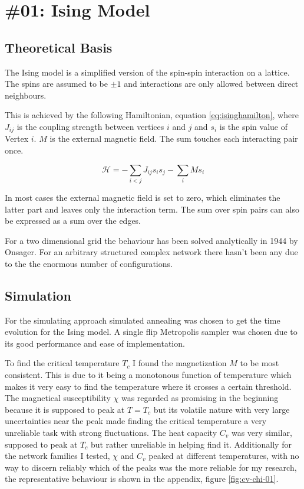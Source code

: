\chapter[Task 01]{\#01: Ising Model}


\section{Theoretical Basis}
 The Ising model is a simplified version of the spin-spin interaction on a lattice. The spins are assumed to be $\pm1$ and interactions are only allowed between direct neighbours.
 
 This is achieved by the following Hamiltonian, equation \ref{eq:isinghamilton}, where $J_{ij}$ is the coupling strength between vertices $i$ and $j$ and $s_i$ is the spin value of Vertex $i$. $M$ is the external magnetic field. The sum touches each interacting pair once.
 
 \begin{equation}
 	\mathcal{H} = -\sum_{i<j} J_{ij} s_i s_j - \sum_{i} M s_i \label{eq:isinghamilton}
 \end{equation}

In most cases the external magnetic field is set to zero, which eliminates the latter part and leaves only the interaction term. The sum over spin pairs can also be expressed as a sum over the edges.

For a two dimensional grid the behaviour has been solved analytically in 1944 by Onsager\cite{Onsager}. For an arbitrary structured complex network there hasn't been any due to the the enormous number of configurations.

\section{Simulation}
For the simulating approach simulated annealing was chosen to get the time evolution for the Ising model. A single flip Metropolis sampler was chosen due to its good performance and ease of implementation.

To find the critical temperature $T_c$ I found the magnetization $M$ to be most consistent.
This is due to it being a monotonous function of temperature which makes it very easy to find the temperature where it crosses a certain threshold.
The magnetical susceptibility $\chi$ was regarded as promising in the beginning because it is supposed to peak at $T=T_c$ but its volatile nature with very large uncertainties near the peak made finding the critical temperature a very unreliable task with strong fluctuations.
The heat capacity $C_v$ was very similar, supposed to peak at $T_c$ but rather unreliable in helping find it.
Additionally for the network families I tested, $\chi$ and $C_v$ peaked at different temperatures, with no way to discern reliably which of the peaks was the more reliable for my research, the representative behaviour is shown in the appendix, figure \ref{fig:cv-chi-01}.

